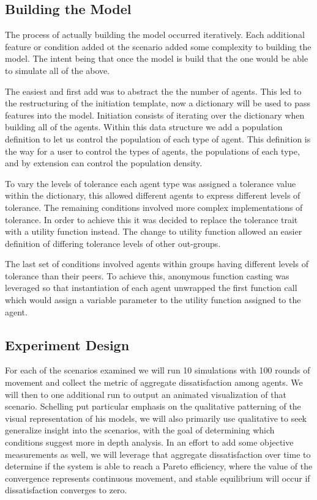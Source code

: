 \documentclass[sigplan,nonacm]{acmart}
\begin{document}
\subsection{Building the Model}

The process of actually building the model occurred iteratively.
Each additional feature or condition added ot the scenario added some complexity to building the model.
The intent being that once the model is build that the one would be able to simulate all of the above.

The easiest and first add was to abstract the the number of agents.
This led to the restructuring of the initiation template, now a dictionary will be used to pass
features into the model.
Initiation consists of iterating over the dictionary when building all of the agents.
Within this data structure we add a population definition to let us control the population of each type of agent.
This definition is the way for a user to control the types of agents, the populations of each type, 
and by extension can control the population density.

To vary the levels of tolerance each agent type was assigned a tolerance value within the dictionary,
this allowed different agents to express different levels of tolerance.
The remaining conditions involved more complex implementations of tolerance.
In order to achieve this it was decided to replace the tolerance trait with a utility function instead.
The change to utility function allowed an easier definition of differing tolerance levels of other out-groups.

The last set of conditions involved agents within groups having different levels of tolerance than their peers.
To achieve this, anonymous function casting was leveraged so that instantiation of each agent
unwrapped the first function call which would assign a variable parameter to the utility function assigned to the agent.

\subsection{Experiment Design}

For each of the scenarios examined we will run 10 simulations with 100 rounds of movement and collect the metric
of aggregate dissatisfaction among agents.
We will then to one additional run to output an animated visualization of that scenario.
Schelling put particular emphasis on the qualitative patterning of the visual representation of his models,
we will also primarily use qualitative to seek generalize insight into the scenarios, with the goal of 
determining which conditions suggest more in depth analysis.
In an effort to add some objective measurements as well, we will leverage that aggregate dissatisfaction over time
to determine if the system is able to reach a Pareto efficiency, where the value of the convergence represents
continuous movement, and stable equilibrium will occur if dissatisfaction converges to zero.
\end{document}
